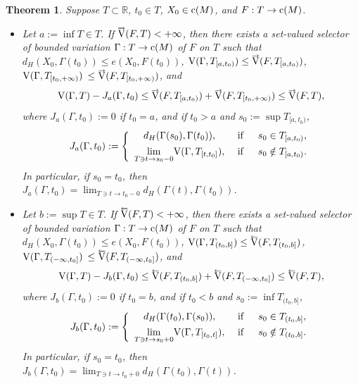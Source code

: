 \documentclass[preprint,12pt]{elsarticle}
\newtheorem{thm}{Theorem}
\newcommand{\Rb}{\mathbb{R}}  \newcommand{\Nb}{\mathbb{N}}
\newcommand{\nV}{\mbox{\rm V}}
\newcommand{\riV}{{\scriptstyle\overrightarrow{\mbox{\rm V}}}}
\newcommand{\leV}{{\scriptstyle\overleftarrow{\mbox{\rm V}}}}
\begin{document}
\begin{thm} \label{t:BV}
Suppose $T\subset\Rb$, $t_0\in T$, $X_0\in\mbox{\rm c}(M)$, and
$F:T\to\mbox{\rm c}(M)$.

  \begin{itemize}
\item[{\rm(a)}] Let $a:=\inf T\in T$. If\/ $\riV(F,T)<+\infty$, then there exists
a set-valued selector of bounded variation $\Gamma:T\to\mbox{\rm c}(M)$
of $F$ on $T$ such that  $d_H(X_0,\Gamma(t_0))\le e(X_0,F(t_0))$,
$\nV(\Gamma,T_{[a,t_0)})\le\riV(F,T_{[a,t_0)})$,
$\nV(\Gamma,T_{[t_0,+\infty)})$ $\le\riV(F,T_{[t_0,+\infty)})$,
and
  \begin{equation} \label{e:s1t0}
\nV(\Gamma,T)-J_a(\Gamma,t_0)\le
  \riV(F,T_{[a,t_0)})+\riV(F,T_{[t_0,+\infty)})\le\riV(F,T),
  \end{equation}
where $J_a(\Gamma,t_0):=0$ if $t_0=a$, and if $t_0>a$ and $s_0:=\sup T_{[a,t_0)}$,
  \begin{equation} \label{e:J}
J_a(\Gamma,t_0):=\left\{
  \begin{array}{ccc}
d_H(\Gamma(s_0),\Gamma(t_0)), & \,\,\mbox{if}\,\,\, & s_0\in T_{[a,t_0)},\\[4pt]
\displaystyle\lim_{T\ni t\to s_0-0}\!\nV(\Gamma,T_{[t,t_0]}),
  & \,\,\mbox{if}\,\,\, & s_0\notin T_{[a,t_0)}.
  \end{array}\right.
  \end{equation}
In particular, if $s_0=t_0$, then $J_a(\Gamma,t_0)=\displaystyle%
\lim_{T\ni t\to t_0-0}\!d_H(\Gamma(t),\Gamma(t_0))$.

\item[{\rm(b)}] Let $b:=\sup T\in T$. If\/ $\leV(F,T)<+\infty$, then there exists
a set-valued selector of bounded variation $\Gamma:T\to\mbox{\rm c}(M)$
of $F$ on $T$ such that  $d_H(X_0,\Gamma(t_0))\le e(X_0,F(t_0))$,
$\nV(\Gamma,T_{(t_0,b]})\le\leV(F,T_{(t_0,b]})$,
$\nV(\Gamma,T_{(-\infty,t_0]})$ $\le\leV(F,T_{(-\infty,t_0]})$,
and
  \begin{equation*}
\nV(\Gamma,T)-J_b(\Gamma,t_0)\le
  \leV(F,T_{(t_0,b]})+\leV(F,T_{(-\infty,t_0]})\le\leV(F,T),
  \end{equation*}
where $J_b(\Gamma,t_0):=0$ if $t_0=b$, and if $t_0<b$ and $s_0:=\inf T_{(t_0,b]}$,
  \begin{equation*}
J_b(\Gamma,t_0):=\left\{
  \begin{array}{ccc}
d_H(\Gamma(t_0),\Gamma(s_0)), & \,\,\mbox{if}\,\,\, & s_0\in T_{(t_0,b]},\\[4pt]
\displaystyle\lim_{T\ni t\to s_0+0}\!\nV(\Gamma,T_{[t_0,t]}),
  & \,\,\mbox{if}\,\,\, & s_0\notin T_{(t_0,b]}.
  \end{array}\right.
  \end{equation*}
In particular, if $s_0=t_0$, then $J_b(\Gamma,t_0)=\displaystyle%
\lim_{T\ni t\to t_0+0}\!d_H(\Gamma(t_0),\Gamma(t))$.
  \end{itemize}
\end{thm}
\end{document}

